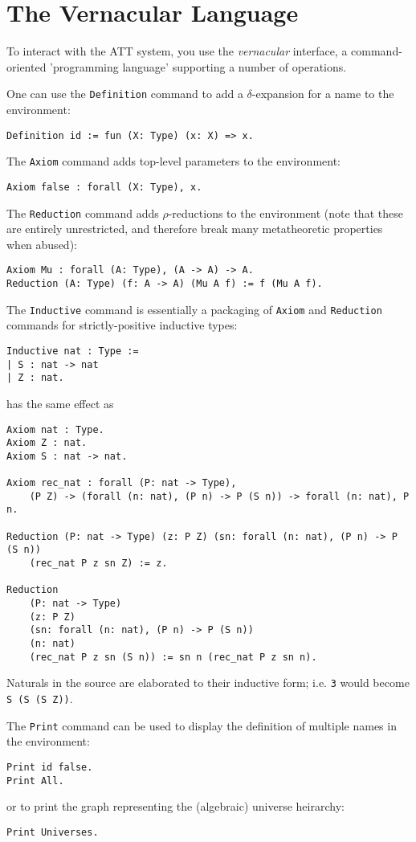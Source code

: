 \documentclass{article}
\begin{document}
\section{The Vernacular Language}

To interact with the ATT system, you use the \emph{vernacular} interface, a command-oriented 'programming language' supporting a number of operations.

One can use the \texttt{Definition} command to add a $\delta$-expansion for a name to the environment:
\begin{lstlisting}
Definition id := fun (X: Type) (x: X) => x.
\end{lstlisting}

The \texttt{Axiom} command adds top-level parameters to the environment:
\begin{lstlisting}
Axiom false : forall (X: Type), x.
\end{lstlisting}

The \texttt{Reduction} command adds $\rho$-reductions to the environment (note that these are entirely unrestricted, and therefore break many metatheoretic properties when abused):
\begin{lstlisting}
Axiom Mu : forall (A: Type), (A -> A) -> A.
Reduction (A: Type) (f: A -> A) (Mu A f) := f (Mu A f).
\end{lstlisting}

The \texttt{Inductive} command is essentially a packaging of \texttt{Axiom} and \texttt{Reduction} commands for strictly-positive inductive types:
\begin{lstlisting}
Inductive nat : Type :=
| S : nat -> nat
| Z : nat.
\end{lstlisting}
has the same effect as
\begin{lstlisting}
Axiom nat : Type.
Axiom Z : nat.
Axiom S : nat -> nat.

Axiom rec_nat : forall (P: nat -> Type),
    (P Z) -> (forall (n: nat), (P n) -> P (S n)) -> forall (n: nat), P n.

Reduction (P: nat -> Type) (z: P Z) (sn: forall (n: nat), (P n) -> P (S n))
    (rec_nat P z sn Z) := z.

Reduction
    (P: nat -> Type)
    (z: P Z)
    (sn: forall (n: nat), (P n) -> P (S n))
    (n: nat)
    (rec_nat P z sn (S n)) := sn n (rec_nat P z sn n).
\end{lstlisting}
Naturals in the source are elaborated to their inductive form; i.e. \texttt{3} would become \texttt{S (S (S Z))}.

The \texttt{Print} command can be used to display the definition of multiple names in the environment:
\begin{lstlisting}
Print id false.
Print All.
\end{lstlisting}
or to print the graph representing the (algebraic) universe heirarchy:
\begin{lstlisting}
Print Universes.
\end{lstlisting}
\end{document}

